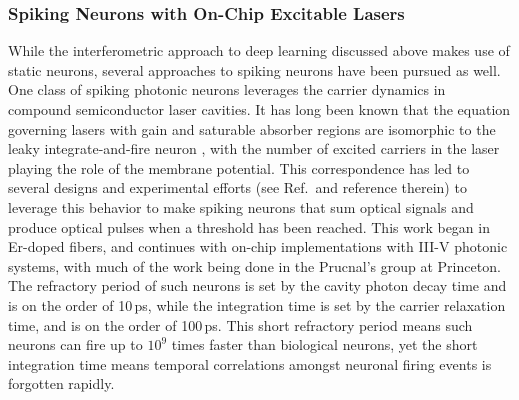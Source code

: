 \vspace{3em}
\cite{nate2017}

\vspace{3em}
\cite{laso2012}


\subsubsection{Spiking Neurons with On-Chip Excitable Lasers}
While the interferometric approach to deep learning discussed above makes use of static neurons, several approaches to spiking neurons have been pursued as well. One class of spiking photonic neurons leverages the carrier dynamics in compound semiconductor laser cavities. It has long been known that the equation governing lasers with gain and saturable absorber regions are isomorphic to the leaky integrate-and-fire neuron \cite{dukr1999}, with the number of excited carriers in the laser playing the role of the membrane potential. This correspondence has led to several designs \cite{nata2013} and experimental efforts (see Ref.\,\cite{prsh2017} and reference therein) to leverage this behavior to make spiking neurons that sum optical signals and produce optical pulses when a threshold has been reached. This work began in Er-doped fibers, and continues with on-chip implementations with III-V photonic systems, with much of the work being done in the Prucnal's group at Princeton. The refractory period of such neurons is set by the cavity photon decay time and is on the order of 10\,ps, while the integration time is set by the carrier relaxation time, and is on the order of 100\,ps. This short refractory period means such neurons can fire up to $10^9$ times faster than biological neurons, yet the short integration time means temporal correlations amongst neuronal firing events is forgotten rapidly. 

